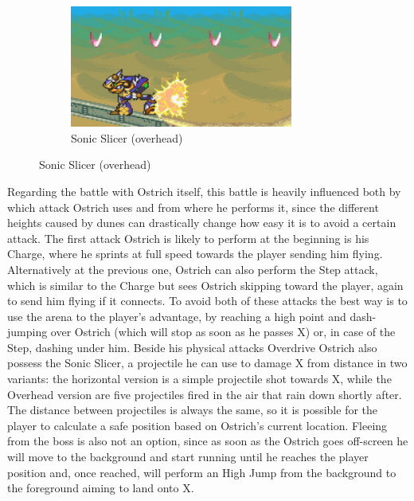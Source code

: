\begin{figure}[htp]
\begin{subfigure}{\linewidth}
		\includegraphics[height=4cm]{figures/X2/Overdrive_ostrich/Ostrich_charged_SS_2.png}
		\caption{Sonic Slicer (overhead)}
	\end{subfigure}
\end{figure}

Regarding the battle with Ostrich itself, this battle is heavily influenced both by which attack Ostrich uses and from where he performs it, since the different heights caused by dunes can drastically change how easy it is to avoid a certain attack. The first attack Ostrich is likely to perform at the beginning is his Charge, where he sprints at full speed towards the player sending him flying. Alternatively at the previous one, Ostrich can also perform the Step attack, which is similar to the Charge but sees Ostrich skipping toward the player, again to send him flying if it connects. To avoid both of these attacks the best way is to use the arena to the player's advantage, by reaching a high point and dash-jumping over Ostrich (which will stop as soon as he passes X) or, in case of the Step, dashing under him. Beside his physical attacks Overdrive Ostrich also possess the Sonic Slicer, a projectile he can use to damage X from distance in two variants: the horizontal version is a simple projectile shot towards X, while the Overhead version are five projectiles fired in the air that rain down shortly after. The distance between projectiles is always the same, so it is possible for the player to calculate a safe position based on Ostrich's current location. Fleeing from the boss is also not an option, since as soon as the Ostrich goes off-screen he will move to the  background and start running until he reaches the player position and, once reached, will perform an High Jump from the background to the foreground aiming to land onto X.

